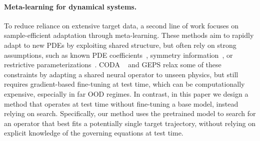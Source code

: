 \documentclass{article}
\theoremstyle{plain}
\theoremstyle{definition}
\theoremstyle{remark}
\begin{document}
\paragraph{Meta-learning for dynamical systems.}
To reduce reliance on extensive target data, a second line of work focuses on sample-efficient adaptation through meta-learning. 
These methods aim to rapidly adapt to new PDEs by exploiting shared structure, but often rely on strong assumptions, such as known PDE coefficients~\citep{wang2022meta}, symmetry information~\citep{mialon2023self}, or restrictive parameterizations~\citep{blanke2023interpretable}. CODA ~\citep{kirchmeyer2022generalizing} and GEPS \citep{koupai2024geps} relax some of these constraints by adapting a shared neural operator to unseen physics, but still requires gradient-based fine-tuning at test time, which can be computationally expensive, especially in far OOD regimes.
In contrast, in this paper we design a method that operates at test time without fine-tuning a base model, instead relying on search. Specifically, our method uses the pretrained model to search for an operator that best fits a potentially single target trajectory, without relying on explicit knowledge of the governing equations at test time.
\end{document}
